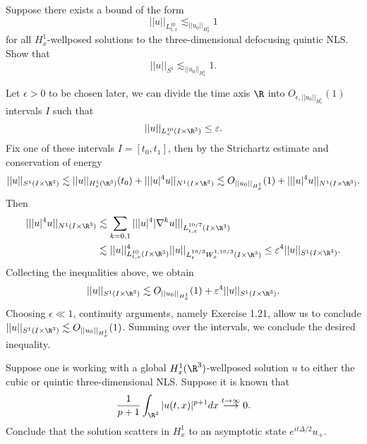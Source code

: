 \begin{statement}
	Suppose there exists a bound of the form
		\[ ||u||_{L^{10}_{t, x}} \lesssim_{||u_0||_{H^1_0}} 1\]
	for all $H^1_x$-wellposed solutions to the three-dimensional defocusing quintic NLS. Show that 
		\[ ||u||_{S^1} \lesssim_{||u_0||_{H^1_x}} 1. \]
\end{statement}

\begin{solution}
	Let $\epsilon > 0$ to be chosen later, we can divide the time axis $\R$ into $O_{\epsilon, ||u_0||_{H^1_x}} (1)$ intervals $I$ such that
		\[ ||u||_{L^{10}_x (I \times \R^3)} \leq \epsilon. \]
	Fix one of these intervals $I= [t_0, t_1]$, then by the Strichartz estimate and conservation of energy
		\[ ||u||_{S^1 (I \times \R^3)} \lesssim ||u||_{H^1_x (\R^3)} (t_0) + |||u|^4 u||_{N^1 (I \times \R^3)} \lesssim O_{||u_0||_{H^1_x}} (1) + || |u|^4 u||_{N^1 (I \times \R^3)} . \]
	Then 
		\begin{align*}
			|| |u|^4 u||_{N^1 (I \times \R^3)}
				&\lesssim \sum_{k = 0, 1} || |u|^4 |\nabla^k u| ||_{L^{10/7}_{t, x} (I \times \R^3)} \\
				&\lesssim ||u||_{L^{10}_{t, x} (I \times \R^3)}^4 ||u||_{L^{10/3}_t W^{1, 10/3}_x (I \times \R^3)} \leq \epsilon^4 ||u||_{S^1 (I \times \R^3)}.
		\end{align*}
	Collecting the inequalities above, we obtain
		\[ ||u||_{S^1 (I \times \R^3)} \lesssim O_{||u_0||_{H^1_x}} (1) + \epsilon^4 ||u||_{S^1 (I \times \R^3)}. \]
	Choosing $\epsilon \ll 1$, continuity arguments, namely Exercise 1.21, allow us to conclude $||u||_{S^1 (I \times \R^3)} \lesssim O_{||u_0||_{H^1_x}}(1)$. Summing over the intervals, we conclude the desired inequality. 
\end{solution}

\begin{statement}
	Suppose one is working with a global $H^1_x (\R^3)$-wellposed solution $u$ to either the cubic or quintic three-dimensional NLS. Suppose it is known that 
		\[ \frac{1}{p + 1} \int_{\R^3} |u(t, x)|^{p + 1} dx \overset{t \to \infty}{\longrightarrow} 0. \]
	Conclude that the solution scatters in $H^1_x$ to an asymptotic state $e^{i t \Delta/2} u_+$. 	
\end{statement}

